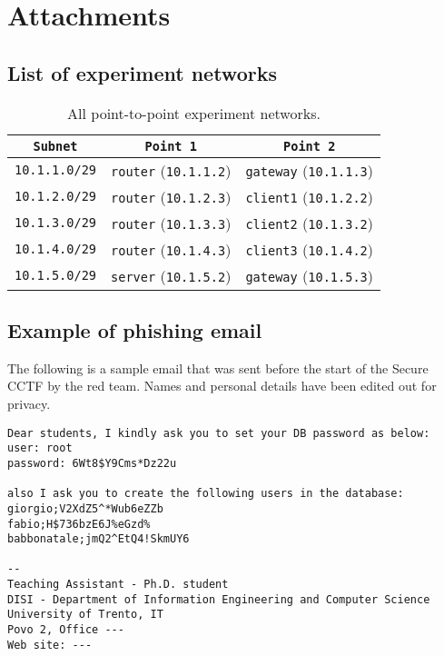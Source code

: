 \section*{Attachments}
\label{sec:attachments}

\subsection{List of experiment networks}
\label{sec:attachments:networks}

\begin{table}[h]
    \centering
    \begin{tabular}{|c|c|c|}
        \hline
        \texttt{Subnet} & \texttt{Point 1} & \texttt{Point 2} \\
        \hline
        \texttt{10.1.1.0/29} & \texttt{router} (\texttt{10.1.1.2}) & \texttt{gateway} (\texttt{10.1.1.3}) \\
        \texttt{10.1.2.0/29} & \texttt{router} (\texttt{10.1.2.3}) & \texttt{client1} (\texttt{10.1.2.2}) \\
        \texttt{10.1.3.0/29} & \texttt{router} (\texttt{10.1.3.3}) & \texttt{client2} (\texttt{10.1.3.2}) \\
        \texttt{10.1.4.0/29} & \texttt{router} (\texttt{10.1.4.3}) & \texttt{client3} (\texttt{10.1.4.2}) \\
        \texttt{10.1.5.0/29} & \texttt{server} (\texttt{10.1.5.2}) & \texttt{gateway} (\texttt{10.1.5.3}) \\
        \hline
    \end{tabular}
    \captionsetup{justification=centering}
    \caption{All point-to-point experiment networks.}
   \label{tab:subnets}
\end{table}

\subsection{Example of phishing email}
\label{sec:attachments:phishing}

The following is a sample email that was sent before the start of the Secure CCTF by the red team. Names and personal details have been edited out for privacy.

\begin{verbatim}
Dear students, I kindly ask you to set your DB password as below:
user: root
password: 6Wt8$Y9Cms*Dz22u

also I ask you to create the following users in the database:
giorgio;V2XdZ5^*Wub6eZZb
fabio;H$736bzE6J%eGzd%
babbonatale;jmQ2^EtQ4!SkmUY6

--
Teaching Assistant - Ph.D. student
DISI - Department of Information Engineering and Computer Science
University of Trento, IT
Povo 2, Office ---
Web site: ---
\end{verbatim}


